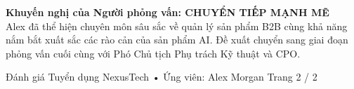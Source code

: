 \documentclass[12pt]{article}
\begin{document}
\noindent\textbf{Khuyến nghị của Người phỏng vấn: CHUYỂN TIẾP MẠNH MẼ} \\
Alex đã thể hiện chuyên môn sâu sắc về quản lý sản phẩm B2B cùng khả năng nắm bắt xuất sắc các rào cản của sản phẩm AI. Đề xuất chuyển sang giai đoạn phỏng vấn cuối cùng với Phó Chủ tịch Phụ trách Kỹ thuật và CPO.

\vfill
\noindent\small{Đánh giá Tuyển dụng NexusTech • Ứng viên: Alex Morgan \hfill Trang 2 / 2}
\end{document}
